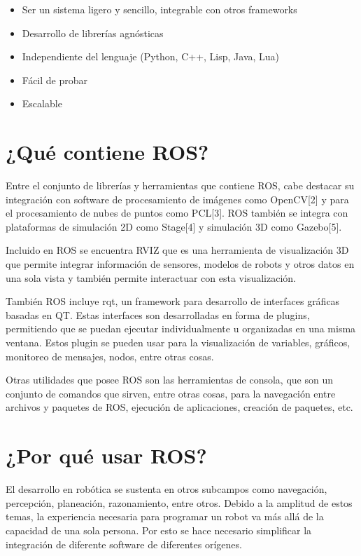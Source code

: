 \begin{itemize}
\item Ser un sistema ligero y sencillo, integrable con otros frameworks
\item Desarrollo de librerías agnósticas
\item Independiente del lenguaje (Python, C++, Lisp, Java, Lua)
\item Fácil de probar
\item Escalable
\end{itemize}


\section{¿Qué contiene ROS?}

Entre el conjunto de librerías y herramientas que contiene ROS, cabe destacar su integración con software de procesamiento de imágenes como OpenCV[2] y para el procesamiento de nubes de puntos como PCL[3]. ROS también se integra con plataformas de simulación 2D como Stage[4] y simulación 3D como Gazebo[5].

Incluido en ROS se encuentra RVIZ que es una herramienta de visualización 3D que permite integrar información de sensores, modelos de robots y otros datos en una sola vista y también permite interactuar con esta visualización.

También ROS incluye rqt, un framework para desarrollo de interfaces gráficas basadas en QT. Estas interfaces son desarrolladas en forma de plugins, permitiendo que se puedan ejecutar individualmente u organizadas en una misma ventana. Estos plugin se pueden usar para la visualización de variables, gráficos, monitoreo de mensajes, nodos, entre otras cosas.

Otras utilidades que posee ROS son las herramientas de consola, que son un conjunto de comandos que sirven, entre otras cosas, para la navegación entre archivos y paquetes de ROS, ejecución de aplicaciones, creación de paquetes, etc.


\section{¿Por qué usar ROS?}

El desarrollo en robótica se sustenta en otros subcampos como navegación, percepción, planeación, razonamiento, entre otros. Debido a la amplitud de estos temas, la experiencia necesaria para programar un robot va más allá de la capacidad de una sola persona. Por esto se hace necesario simplificar la integración de diferente software de diferentes orígenes.

